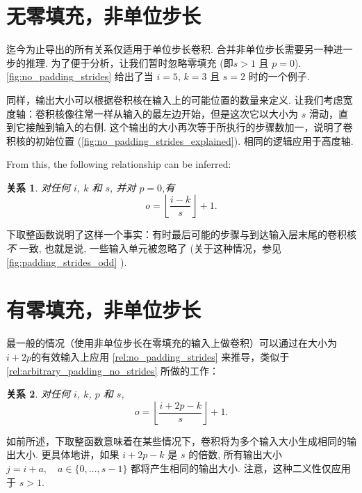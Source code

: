 \documentclass[notitlepage]{ctexrep}
\newtheorem{relationship}{关系}
\begin{document}
\section{无零填充，非单位步长}

迄今为止导出的所有关系仅适用于单位步长卷积. 合并非单位步长需要另一种进一步的推理. 为了便于分析，让我们暂时忽略零填充 (即$s > 1$
且 $p = 0$). \autoref{fig:no_padding_strides} 给出了当 $i =
5$, $k = 3$ 且 $s = 2$ 时的一个例子.

同样，输出大小可以根据卷积核在输入上的可能位置的数量来定义. 让我们考虑宽度轴：卷积核像往常一样从输入的最左边开始，但是这次它以大小为 $s$ 滑动，直到它接触到输入的右侧. 这个输出的大小再次等于所执行的步骤数加一，说明了卷积核的初始位置 
(\autoref{fig:no_padding_strides_explained}). 相同的逻辑应用于高度轴.

From this, the following relationship can be inferred:

\begin{relationship}\label{rel:no_padding_strides}
对任何 $i$, $k$ 和 $s$, 并对 $p = 0$,有
\begin{equation*}
    o = \left\lfloor \frac{i - k}{s} \right\rfloor + 1.
\end{equation*}
\end{relationship}

\noindent 下取整函数说明了这样一个事实：有时最后可能的步骤与到达输入层末尾的卷积核 {\em 不\/} 一致, 也就是说, 一些输入单元被忽略了 (关于这种情况，参见 \autoref{fig:padding_strides_odd} ).

\section{有零填充，非单位步长}

最一般的情况（使用非单位步长在零填充的输入上做卷积）可以通过在大小为$i + 2p$的有效输入上应用 \autoref{rel:no_padding_strides} 来推导，类似于 \autoref{rel:arbitrary_padding_no_strides} 所做的工作： 

\begin{relationship}\label{rel:padding_strides}
对任何 $i$, $k$, $p$ 和 $s$,
\begin{equation*}
    o = \left\lfloor \frac{i + 2p - k}{s} \right\rfloor + 1.
\end{equation*}
\end{relationship}

\noindent 如前所述，下取整函数意味着在某些情况下，卷积将为多个输入大小生成相同的输出大小. 更具体地讲，如果 $i + 2p - k$ 是 $s$ 的倍数, 所有输出大小 $j = i + a, \quad a
\in \{0,\ldots,s - 1\}$ 都将产生相同的输出大小. 注意，这种二义性仅应用于 $s > 1$.
\end{document}

